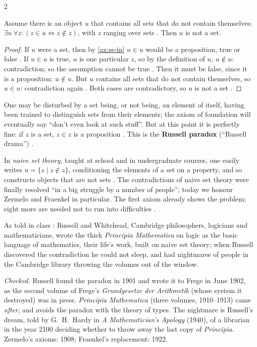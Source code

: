 \begin{paracol}{2}
\begin{proposition}[Russell]\label{prop:se-russell}
Assume there is an object $u$ that contains all sets that do not contain themselves:
$\exists u\ \forall z\colon (z\in u\Leftrightarrow z\notin z)$, with $z$ ranging over sets
. Then $u$ is not a set.
\end{proposition}
\begin{proof}
If $u$ were a set, then by \cref{ax:se-in} $u\in u$ would be a proposition, true or false .
If $u\in u$ is true, $u$ is one particular $z$, so by the definition of $u$, $u\notin u$: contradiction; so the
assumption cannot be true . Then it must be false, since it is a proposition: $u\notin u$.
But $u$ contains all sets that do not contain themselves, so $u\in u$: contradiction again .
Both cases are contradictory, so $u$ is not a set .
\end{proof}
One may be disturbed by a set being, or not being, an element of itself, having been trained to distinguish sets
from their elements; the axiom of foundation will eventually say ``don't even look at such stuff''. But at this
point it is perfectly fine: if $z$ is a set, $z\in z$ is a proposition .
This is the \textbf{Russell paradox} (``Russell drama'') .

In \emph{naive set theory}, taught at school and in undergraduate courses, one easily writes
$u=\{z\mid z\notin z\}$, conditioning the elements of a set on a property, and so constructs objects that are not
sets . The contradictions of naive set theory were finally resolved
``in a big struggle by a number of people''; today we honour Zermelo and Fraenkel in particular. The first axiom
already shows the problem; eight more are needed not to run into difficulties .

\begin{history}
As told in class : Russell and Whitehead, Cambridge philosophers, logicians and
mathematicians, wrote the thick \emph{Principia Mathematica} on logic as the basic language of mathematics, their
life's work, built on naive set theory; when Russell discovered the contradiction he could not sleep, and had
nightmares of people in the Cambridge library throwing the volumes out of the window.\par
\smallskip
\emph{Checked.} Russell found the paradox in 1901 and wrote it to Frege in June 1902, as the second volume of
Frege's \emph{Grundgesetze der Arithmetik} (whose system it destroyed) was in press. \emph{Principia Mathematica}
(three volumes, 1910--1913) came \emph{after}, and avoids the paradox with the theory of types. The nightmare is
Russell's dream, told by G.~H.~Hardy in \emph{A Mathematician's Apology} (1940), of a librarian in the year 2100
deciding whether to throw away the last copy of \emph{Principia}. Zermelo's axioms: 1908; Fraenkel's replacement: 1922.
\end{history}


\end{paracol}

